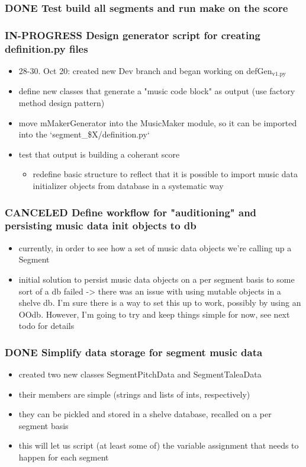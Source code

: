 \documentclass[11pt]{article}
\begin{document}
\subsubsection*{{\bfseries\sffamily DONE} Test build all segments and run make on the score}
\label{sec:org90331c6}


\subsubsection*{{\bfseries\sffamily IN-PROGRESS} Design generator script for creating definition.py files}
\label{sec:org1cc9045}
\begin{itemize}
\item 28-30. Oct 20: created new Dev branch and began working on
defGen\(_{\text{v1.py}}\)
\item define new classes that generate a "music code block" as output (use
factory method design pattern)
\item move mMakerGenerator into the MusicMaker module, so it can be
imported into the `segment\_\$X/definition.py`
\item test that output is building a coherant score
\begin{itemize}
\item redefine basic structure to reflect that it is possible to import music data initializer objects from database in a systematic way
\end{itemize}
\end{itemize}
\subsubsection*{{\bfseries\sffamily CANCELED} Define workflow for "auditioning" and persisting music data init objects to db}
\label{sec:org5b283b3}
\begin{itemize}
\item currently, in order to see how a set of music data objects we're calling up a Segment
\item initial solution to persist music data objects on a per segment basis to some sort of a db failed -> there was an issue with using mutable objects in a shelve db. I'm sure there is a way to set this up to work, possibly by using an OOdb. However, I'm going to try and keep things simple for now, see next todo for details
\end{itemize}
\subsubsection*{{\bfseries\sffamily DONE} Simplify data storage for segment music data}
\label{sec:org17a074f}
\begin{itemize}
\item created two new classes SegmentPitchData and SegmentTaleaData
\item their members are simple (strings and lists of ints, respectively)
\item they can be pickled and stored in a shelve database, recalled on a per segment basis
\item this will let us script (at least some of) the variable assignment that needs to happen for each segment
\end{itemize}
\end{document}
